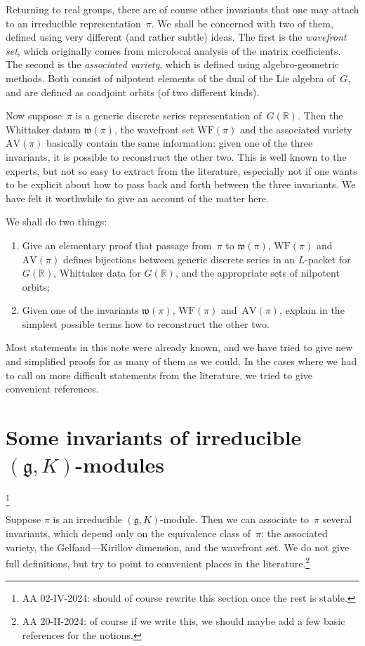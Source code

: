 \documentclass[10pt,leqno]{article}
\newcommand{\R}{\mathbb R}
\newcommand{\g}{\mathfrak g}
\newcommand{\AV}{\mathrm{AV}}
\newcommand{\WF}{\mathrm{WF}}
\begin{document}
Returning to real groups, there are of course other invariants that one may attach to an irreducible representation~$\pi$. We shall be concerned with two of them, defined using very different (and rather subtle) ideas. The first is the \emph{wavefront set}, which originally comes from microlocal analysis of the matrix coefficients. The second is the \emph{associated variety}, which is defined using algebro-geometric methods. Both consist of nilpotent elements of the dual of the Lie algebra of~$G$, and are defined as coadjoint orbits (of two different kinds). 

Now suppose~$\pi$ is a generic discrete series representation of~$G(\R)$. Then the Whittaker datum $\mathfrak{w}(\pi)$, the wavefront set $\WF(\pi)$ and the associated variety $\AV(\pi)$ basically contain the same information: given one of the three invariants, it is possible to reconstruct the other two. This is well known to the experts, but not so easy to extract from the literature, especially not if one wants to be explicit about how to pass back and forth between the three invariants. We have felt it worthwhile to give an account of the matter here. 

We shall do two things: 
\begin{enumerate}
\item Give an elementary proof that passage from~$\pi$ to $\mathfrak{w}(\pi)$, $\WF(\pi)$ and $\AV(\pi)$ defines bijections between generic discrete series in an $L$-packet for $G(\R)$, Whittaker data for $G(\R)$, and the appropriate sets of nilpotent orbits;
\item Given one of the invariants $\mathfrak{w}(\pi)$, $\WF(\pi)$ and~$\AV(\pi)$, explain in the simplest possible terms how to reconstruct the other two. 
\end{enumerate}
Most statements in this note were already known, and we have tried to give new and simplified proofs for as many of them as we could. In the cases where we had to call on more difficult statements from the literature, we tried to give convenient references. 

\section{Some invariants of irreducible $(\g, K)$-modules}

\footnote{AA 02-IV-2024: should of course rewrite this section once the rest is stable.}

Suppose $\pi$ is an irreducible $(\g,K)$-module. Then we can associate to~$\pi$ several invariants, which depend only on the equivalence class of~$\pi$: the associated variety, the Gelfand---Kirillov dimension, and the wavefront set.  We do not give full definitions, but try to point to convenient places in the literature.\footnote{AA 20-II-2024: of course if we write this, we should maybe add a few basic references for the notions.}
\end{document}
